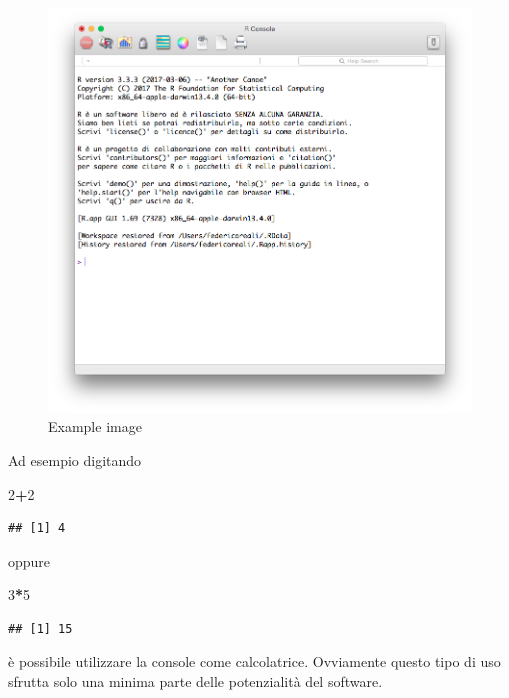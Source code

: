 \documentclass[]{book}
\newenvironment{Shaded}{\begin{snugshade}}{\end{snugshade}}
\newcommand{\DecValTok}[1]{\textcolor[rgb]{0.00,0.00,0.81}{#1}}
\newcommand{\OperatorTok}[1]{\textcolor[rgb]{0.81,0.36,0.00}{\textbf{#1}}}
\begin{document}
\begin{figure}
\centering
\includegraphics{./media/R_open.png}
\caption{Example image}
\end{figure}

Ad esempio digitando

\begin{Shaded}
\begin{Highlighting}[]
\DecValTok{2}\OperatorTok{+}\DecValTok{2}
\end{Highlighting}
\end{Shaded}

\begin{verbatim}
## [1] 4
\end{verbatim}

oppure

\begin{Shaded}
\begin{Highlighting}[]
\DecValTok{3}\OperatorTok{*}\DecValTok{5}
\end{Highlighting}
\end{Shaded}

\begin{verbatim}
## [1] 15
\end{verbatim}

è possibile utilizzare la console come calcolatrice. Ovviamente questo tipo di uso sfrutta solo una minima parte delle potenzialità del software.
\end{document}
